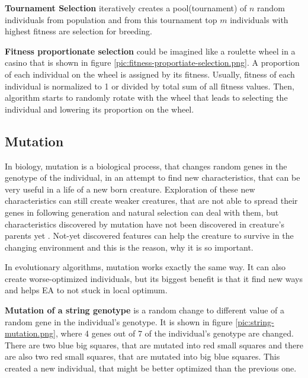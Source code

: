 
\textbf{Tournament Selection} iteratively creates a pool(tournament) of $n$ random individuals from population and from this tournament top $m$ individuals with highest fitness are selection for breeding.

\textbf{Fitness proportionate selection} could be imagined like a roulette wheel in a casino that is shown in figure  \ref{pic:fitness-proportiate-selection.png}. A proportion of each individual on the wheel is assigned by its fitness. Usually, fitness of each individual is normalized to 1 or divided by total sum of all fitness values. Then, algorithm starts to randomly rotate with the wheel that leads to selecting the individual and lowering its proportion on the wheel.


\subsection{Mutation}
In biology, mutation is a biological process, that changes random genes in the genotype of the individual, in an attempt to find new characteristics, that can be very useful in a life of a new born creature. Exploration of these new characteristics can still create weaker creatures, that are not able to spread their genes in following generation and natural selection can deal with them, but characteristics discovered by mutation have not been discovered in creature's parents yet . Not-yet discovered features can help the creature to survive in the changing environment and this is the reason, why it is so important.

In evolutionary algorithms, mutation works exactly the same way. It can also create worse-optimized individuals, but its biggest benefit is that it find new ways and helps EA to not stuck in local optimum.

\textbf{Mutation of a string genotype} is a random change to different value of a random gene in the individual's genotype. It is shown in figure \ref{pic:string-mutation.png}, where 4 genes out of 7 of the individual's genotype are changed. There are two blue big squares, that are mutated into red small squares and there are also two red small squares, that are mutated into big blue squares. This created a new individual, that might be better optimized than the previous one.


